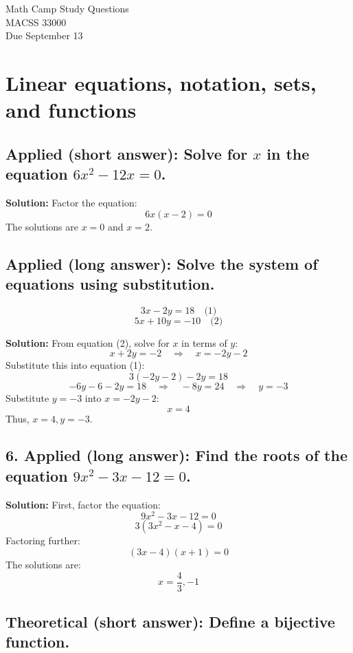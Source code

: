 \documentclass[12pt]{article}
\begin{document}
	\begin{center}
		Math Camp Study Questions\\
        MACSS 33000 \\
		Due September 13 \\
	\end{center}


\section{Linear equations, notation, sets, and functions}

\subsection{Applied (short answer): Solve for \( x \) in the equation \( 6x^2 - 12x = 0 \).}

\textbf{Solution:} 
Factor the equation:
\[
6x(x - 2) = 0
\]
The solutions are \( x = 0 \) and \( x = 2 \).

\subsection{Applied (long answer): Solve the system of equations using substitution.}
\[
3x - 2y = 18 \quad \text{(1)}
\]
\[
5x + 10y = -10 \quad \text{(2)}
\]

\textbf{Solution:} 
From equation (2), solve for \( x \) in terms of \( y \):
\[
x + 2y = -2 \quad \Rightarrow \quad x = -2y - 2
\]
Substitute this into equation (1):
\[
3(-2y - 2) - 2y = 18
\]
\[
-6y - 6 - 2y = 18 \quad \Rightarrow \quad -8y = 24 \quad \Rightarrow \quad y = -3
\]
Substitute \( y = -3 \) into \( x = -2y - 2 \):
\[
x = 4
\]
Thus, \( x = 4, y = -3 \).

\subsection{6. Applied (long answer): Find the roots of the equation \( 9x^2 - 3x - 12 = 0 \).}

\textbf{Solution:} 
First, factor the equation:
\[
9x^2 - 3x - 12 = 0
\]
\[
3(3x^2 - x - 4) = 0
\]
Factoring further:
\[
(3x - 4)(x + 1) = 0
\]
The solutions are:
\[
x = \frac{4}{3}, -1
\]

\subsection{Theoretical (short answer): Define a bijective function.}
\end{document}
